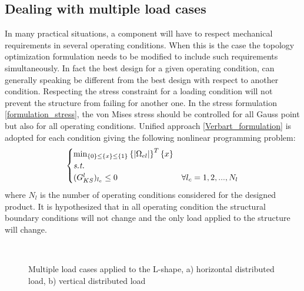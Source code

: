 \subsection{Dealing with multiple load cases}
In many practical situations, a component will have to respect mechanical requirements in several operating conditions. When this is the case the topology optimization formulation needs to be modified to include such requirements simultaneously. In fact the best design for a given operating condition, can generally speaking be different from the best design with respect to another condition. Respecting the stress constraint for a loading condition will not prevent the structure from failing for another one. In the stress formulation \ref{formulation_stress}, the von Mises stress should be controlled for all Gauss point but also for all operating conditions. Unified approach \ref{Verbart_formulation} is adopted for each condition giving the following nonlinear programming problem:
\begin{equation}
\begin{cases}
\min_{\left\lbrace{0}\right \rbrace\leq\left\lbrace{x}\right \rbrace\leq\left\lbrace{1}\right \rbrace} {\left\lbrace{|\Omega_{el}|}\right \rbrace^T\left\lbrace{x}\right \rbrace} \\
\textit{s.t.}\\
(G^{l}_{KS})_{l_c}\leq 0 & \forall l_c=1,2,...,N_l \\
\end{cases}
\end{equation}
where $N_l$ is the number of operating conditions considered for the designed product. It is hypothesized that in all operating condition the structural boundary conditions will not change and the only load applied to the structure will change. 
\begin{figure}[ht]
\centering
{}%
\quad
{}%
  \\
\caption{Multiple load cases applied to the L-shape, a) horizontal distributed load, b) vertical distributed load}%
\label{fig.2.21}%
\end{figure}
